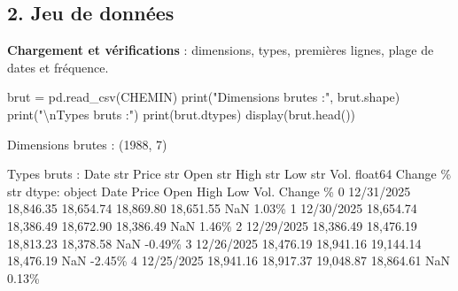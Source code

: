 \documentclass[
  10pt,
]{article}
\newenvironment{Shaded}{}{}
\newcommand{\BuiltInTok}[1]{\textcolor[rgb]{0.00,0.50,0.00}{#1}}
\newcommand{\CharTok}[1]{\textcolor[rgb]{0.25,0.44,0.63}{#1}}
\newcommand{\NormalTok}[1]{#1}
\newcommand{\OperatorTok}[1]{\textcolor[rgb]{0.40,0.40,0.40}{#1}}
\newcommand{\StringTok}[1]{\textcolor[rgb]{0.25,0.44,0.63}{#1}}
\begin{document}
\hypertarget{jeu-de-donnuxe9es}{%
\subsection{2. Jeu de données}\label{jeu-de-donnuxe9es}}

\textbf{Chargement et vérifications} : dimensions, types, premières
lignes, plage de dates et fréquence.

\begin{Shaded}
\begin{Highlighting}[]
\NormalTok{brut }\OperatorTok{=}\NormalTok{ pd.read\_csv(CHEMIN)}
\BuiltInTok{print}\NormalTok{(}\StringTok{"Dimensions brutes :"}\NormalTok{, brut.shape)}
\BuiltInTok{print}\NormalTok{(}\StringTok{"}\CharTok{\textbackslash{}n}\StringTok{Types bruts :"}\NormalTok{)}
\BuiltInTok{print}\NormalTok{(brut.dtypes)}
\NormalTok{display(brut.head())}
\end{Highlighting}
\end{Shaded}

\begin{Shaded}
\begin{Highlighting}[]
\NormalTok{Dimensions brutes : (1988, 7)}

\NormalTok{Types bruts :}
\NormalTok{Date            str}
\NormalTok{Price           str}
\NormalTok{Open            str}
\NormalTok{High            str}
\NormalTok{Low             str}
\NormalTok{Vol.        float64}
\NormalTok{Change \%        str}
\NormalTok{dtype: object}
\NormalTok{         Date      Price       Open       High        Low  Vol. Change \%}
\NormalTok{0  12/31/2025  18,846.35  18,654.74  18,869.80  18,651.55   NaN    1.03\%}
\NormalTok{1  12/30/2025  18,654.74  18,386.49  18,672.90  18,386.49   NaN    1.46\%}
\NormalTok{2  12/29/2025  18,386.49  18,476.19  18,813.23  18,378.58   NaN   {-}0.49\%}
\NormalTok{3  12/26/2025  18,476.19  18,941.16  19,144.14  18,476.19   NaN   {-}2.45\%}
\NormalTok{4  12/25/2025  18,941.16  18,917.37  19,048.87  18,864.61   NaN    0.13\%}
\end{Highlighting}
\end{Shaded}
\end{document}
